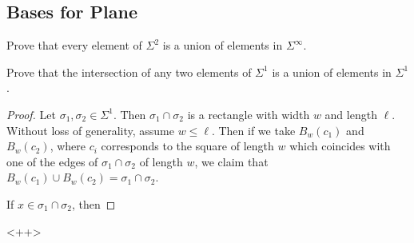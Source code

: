 \subsection{Bases for Plane}

\begin{minorEx}
    Prove that every element of $\Sigma^2$ is a union of elements in
    $\Sigma^\infty$.
\end{minorEx}

\begin{minorEx}
    Prove that the intersection of any two elements of $\Sigma^1$ is a union of
    elements in $\Sigma^1$.
\end{minorEx}

\begin{proof}
    Let $\sigma_1, \sigma_2 \in \Sigma^1$. Then $\sigma_1 \cap \sigma_2$ is a
    rectangle with width $w$ and length $\ell$. Without loss of generality,
    assume $w \leq \ell$. Then if we take $B_w(c_1)$ and $B_w(c_2)$, where $c_i$
    corresponds to the square of length $w$ which coincides with one of the
    edges of $\sigma_1 \cap \sigma_2$ of length $w$, we claim that $B_w(c_1)
    \cup B_w(c_2) = \sigma_1 \cap \sigma_2$.

    If $x \in \sigma_1 \cap \sigma_2$, then 
\end{proof}<++>

